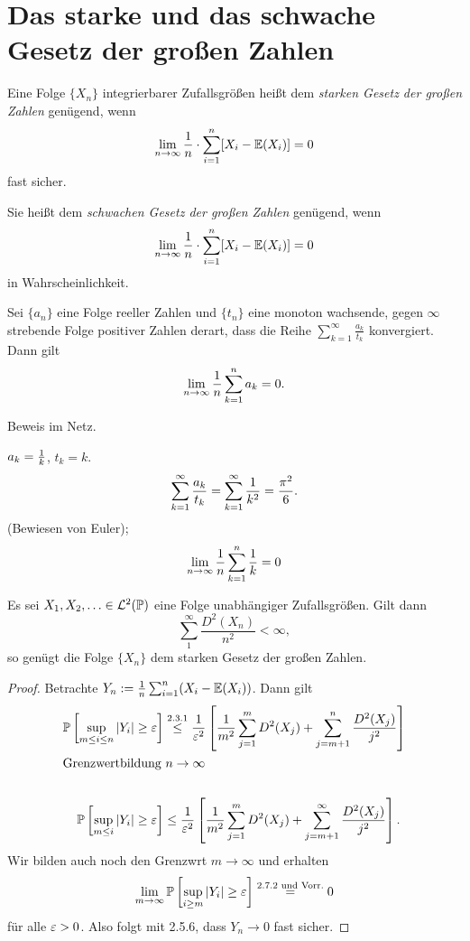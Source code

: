 \section{Das starke und das schwache Gesetz der großen Zahlen}
\begin{defn}
  Eine Folge $\{ X_n \}$ integrierbarer Zufallsgrößen heißt dem \emph{starken
    Gesetz der großen Zahlen} genügend, wenn
  \[ \lim_{n \to \infty} \frac{1}{n} \cdot \sum_{i=1}^n [X_i - \mathbb{E}(X_i)] = 0\]
  fast sicher.

  Sie heißt dem \emph{schwachen Gesetz der großen Zahlen} genügend, wenn
  \[ \lim_{n \to \infty} \frac{1}{n} \cdot \sum_{i=1}^n [X_i - \mathbb{E}(X_i)] = 0\]
  in Wahrscheinlichkeit.
\end{defn}

\begin{lem}[Kronecker]
  Sei $\{a_n\}$ eine Folge reeller Zahlen und $\{t_n\}$ eine monoton wachsende,
  gegen $\infty$ strebende Folge positiver Zahlen derart, dass die Reihe
  $\sum_{k=1}^\infty \frac{a_k}{t_k}$ konvergiert. Dann gilt
  \[ \lim_{n \to \infty} \frac{1}{n} \sum_{k=1}^n a_k = 0. \]
\end{lem}

Beweis im Netz.

\begin{exmp*}
  $a_k = \frac{1}{k}$, $t_k = k$.
  \[ \sum_{k=1}^\infty \frac{a_k}{t_k} =\sum_{k=1}^\infty \frac{1}{k^2} =
    \frac{\pi^2}{6}. \]
  (Bewiesen von Euler);
  \[ \lim_{n \to \infty} \frac{1}{n} \sum_{k=1}^n \frac{1}{k} = 0 \]
\end{exmp*}

\begin{thm}[Kolmogorow]
  Es sei $X_1, X_2, \ldots \in \mathcal{L}^2(\mathbb{P})$ eine Folge unabhängiger
  Zufallsgrößen. Gilt dann
  \[ \sum_1^\infty \frac{D^2(X_n)}{n^2} < \infty, \tag{1} \]
  so genügt die Folge $\{X_n\}$ dem starken Gesetz der großen Zahlen.
\end{thm}

\begin{proof}
  Betrachte $Y_n := \frac{1}{n} \sum_{i=1}^n (X_i - \mathbb{E}(X_i))$. Dann gilt
  \begin{align*}
    \mathbb{P} \left[ \sup_{m \le i \le n} |Y_i| \ge \varepsilon \right]
    &\overset{\text{2.3.1}}{\le} \frac{1}{\varepsilon^2}
      \left[ \frac{1}{m^2} \sum_{j=1}^m D^2(X_j) + \sum_{j=m+1}^n \frac{D^2(X_j)}{j^2} \right] \\
    \intertext{Grenzwertbildung $n \to \infty$} \\
    \mathbb{P} \left[ \sup_{m \le i} |Y_i| \ge \varepsilon \right]
    &\le \frac{1}{\varepsilon^2}
      \left[ \frac{1}{m^2} \sum_{j=1}^m D^2(X_j) + \sum_{j=m+1}^\infty \frac{D^2(X_j)}{j^2} \right].
  \end{align*}
  Wir bilden auch noch den Grenzwrt $m \to \infty$ und erhalten
  \[ \lim_{m \to \infty} \mathbb{P} \left[ \sup_{i \ge m} |Y_i| \ge \varepsilon \right]
    \overset{\text{2.7.2 und Vorr.}}{=} 0 \]
  für alle $\varepsilon > 0$. Also folgt mit 2.5.6, dass $Y_n \to 0$ fast sicher.
\end{proof}

